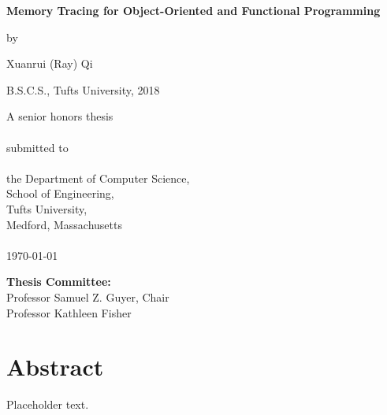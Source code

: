 \documentclass[12pt]{report}
\begin{document}
    
    
\begin{titlepage}
\begin{center}        
\LARGE
\textbf{Memory Tracing for Object-Oriented and Functional Programming}
        
\vspace{0.5in}
\large
by
\vspace{0.5in}

\Large
Xuanrui (Ray) Qi

\vspace{0.25in}

\normalsize
B.S.C.S., Tufts University, 2018

\vspace{1in}

\normalsize
A senior honors thesis\\~\\
submitted to\\~\\
the Department of Computer Science,\\
School of Engineering,\\
Tufts University,\\
Medford, Massachusetts\\~\\
\today

\vspace{0.75in}

\normalsize
\textbf{Thesis Committee:}\\
Professor Samuel Z. Guyer, Chair\\
Professor Kathleen Fisher
        
\end{center}
\end{titlepage}

\section*{\centering Abstract}
\begin{center}
  Placeholder text.
\end{center}
\thispagestyle{empty}

\newpage

\setcounter{tocdepth}{0}
\tableofcontents
\thispagestyle{empty}
\end{document}
